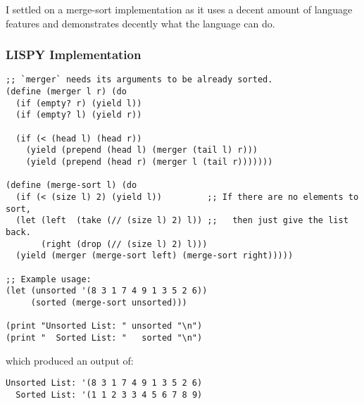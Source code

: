 \documentclass{article}
\begin{document}
   \clearpage

   I settled on a merge-sort implementation as it uses a decent amount of language
   features and demonstrates decently what the language can do.

   \subsubsection{LISPY Implementation}
   \begin{verbatim}
;; `merger` needs its arguments to be already sorted.
(define (merger l r) (do
  (if (empty? r) (yield l))
  (if (empty? l) (yield r))

  (if (< (head l) (head r))
    (yield (prepend (head l) (merger (tail l) r)))
    (yield (prepend (head r) (merger l (tail r)))))))

(define (merge-sort l) (do
  (if (< (size l) 2) (yield l))         ;; If there are no elements to sort,
  (let (left  (take (// (size l) 2) l)) ;;   then just give the list back.
       (right (drop (// (size l) 2) l)))
  (yield (merger (merge-sort left) (merge-sort right)))))

;; Example usage:
(let (unsorted '(8 3 1 7 4 9 1 3 5 2 6))
     (sorted (merge-sort unsorted)))

(print "Unsorted List: " unsorted "\n")
(print "  Sorted List: "   sorted "\n")
   \end{verbatim}

   which produced an output of:
   \begin{Verbatim}
Unsorted List: '(8 3 1 7 4 9 1 3 5 2 6)
  Sorted List: '(1 1 2 3 3 4 5 6 7 8 9)
   \end{Verbatim}

   \clearpage
\end{document}
